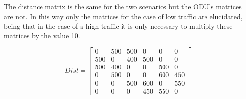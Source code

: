 The distance matrix is the same for the two scenarios but the ODU's matrices are not.
In this way only the matrices for the case of low traffic are elucidated, being that in the case of a high traffic it is only necessary to multiply these matrices by the value 10.

\[
Dist=
  \begin{bmatrix}
    0 & 500 & 500 & 0 & 0 & 0 \\
    500 & 0 & 400 & 500 & 0 & 0 \\
    500 & 400 & 0 & 0 & 500 & 0 \\
    0 & 500 & 0 & 0 & 600 & 450 \\
    0 & 0 & 500 & 600 & 0 & 550 \\
    0 & 0 & 0 & 450 & 550 & 0
  \end{bmatrix}
\]

